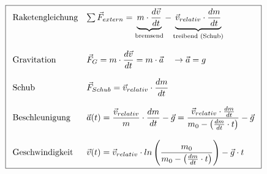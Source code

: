 \[ \boxed{\begin{array}{l l}
\text{Raketengleichung}
	& \sum \vec{F}_{extern} 
	= \underbrace{
		m \cdot \frac{d\vec{v}}{dt}}_\text{bremsend}
	- \underbrace{
		\vec{v}_{relativ} \cdot \frac{dm}{dt}}_\text{treibend (Schub)} \\
& \\
\text{Gravitation}
	& \vec{F}_G = \displaystyle
		m \cdot \frac{d\vec{v}}{dt} = m \cdot \vec{a} 
		\quad \rightarrow \vec{a} = g \\
& \\
\text{Schub}
	& \vec{F}_{Schub} = \displaystyle
		\vec{v}_{relativ} \cdot \frac{dm}{dt} \\
& \\
\text{Beschleunigung}
	& \vec{a}(t) = \displaystyle
		\frac{\vec{v}_{relativ}}{m} 
		\cdot \frac{dm}{dt} - \vec{g} 
	= \displaystyle
		\frac{\vec{v}_{relativ}\cdot \frac{dm}{dt}}{
		m_0 - \left( \frac{dm}{dt} \cdot t\right)} - \vec{g} \\
 & \\
\text{Geschwindigkeit}
	& \vec{v}(t) = \displaystyle
		\vec{v}_{relativ} 
		\cdot ln \left(
			\frac{m_0}{m_0-\left(
				\frac{dm}{dt}\cdot t
			\right)}
		\right)
		- \vec{g} \cdot t 
\end{array} }\]
